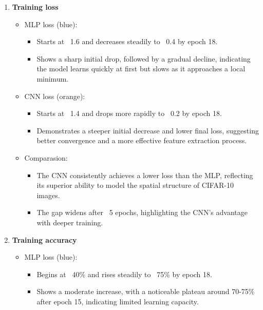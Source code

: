 \documentclass[a4paper,12pt]{article}
\begin{document}
\begin{enumerate}
    \item \textbf{Training loss}
    \begin{itemize}
        \item MLP loss (blue):
        \begin{itemize}
            \item Starts at ~1.6 and decreases steadily to ~0.4 by epoch 18.
            
            \item Shows a sharp initial drop, followed by a gradual decline, indicating the model learns quickly at first but slows as it approaches a local minimum.
        \end{itemize}

        \item CNN loss (orange):
        \begin{itemize}
            \item Starts at ~1.4 and drops more rapidly to ~0.2 by epoch 18.
            
            \item Demonstrates a steeper initial decrease and lower final loss, suggesting better convergence and a more effective feature extraction process.
        \end{itemize}

        \item Comparasion:
        \begin{itemize}
            \item The CNN consistently achieves a lower loss than the MLP, reflecting its superior ability to model the spatial structure of CIFAR-10 images.
            
            \item The gap widens after ~5 epochs, highlighting the CNN's advantage with deeper training.
        \end{itemize}

    \end{itemize}

    \item \textbf{Training accuracy}
    \begin{itemize}
        \item MLP loss (blue):
        \begin{itemize}
            \item Begins at ~40\% and rises steadily to ~75\% by epoch 18.
            
            \item Shows a moderate increase, with a noticeable plateau around 70-75\% after epoch 15, indicating limited learning capacity.
        \end{itemize}


\end{itemize}
\end{enumerate}
\end{document}
